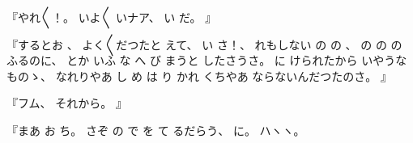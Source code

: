 %
『やれ〳〵！。
%
いよ〳〵
いナア、
%
い
だ。
』

%
『するとお
、
%
よく〳〵だつたと
えて、
%
い
さ！、
%
れもしない
の
の
、
%
の
の
の
ふるのに、
%
とか
いふ
な
へ
び
まうと
したさうさ。
%
に%
けられたから
いやうなものゝ、
%
なれりやあ
し
め
は
り
かれ
%
くちやあ
ならないんだつたのさ。
』

%
『フム、
%
それから。
』

%
『まあ
お
ち。
%
さぞ
の
で
を
て
るだらう、
%
に。%
%
ハヽヽ。

